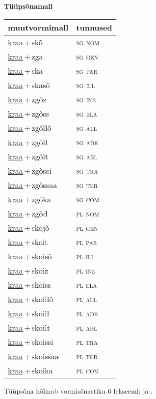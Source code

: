 
\vspace{1.8em}
\begin{minipage}{\textwidth}
\textbf{Tüüpsõnamall \,}\\

\begin{sideways}
\begin{tabular}{l l}
muutvormimall & tunnused \\
\hline
\underline{kraa}\,+\,skõ & \textsc{ sg nom } \\
\underline{kraa}\,+\,zga & \textsc{ sg gen } \\
\underline{kraa}\,+\,ska & \textsc{ sg par } \\
\underline{kraa}\,+\,skasõ & \textsc{ sg ill } \\
\underline{kraa}\,+\,zgõz & \textsc{ sg ine } \\
\underline{kraa}\,+\,zgõss & \textsc{ sg ela } \\
\underline{kraa}\,+\,zgõllõ & \textsc{ sg all } \\
\underline{kraa}\,+\,zgõll & \textsc{ sg ade } \\
\underline{kraa}\,+\,zgõlt & \textsc{ sg abl } \\
\underline{kraa}\,+\,zgõssi & \textsc{ sg tra } \\
\underline{kraa}\,+\,zgõssaa & \textsc{ sg ter } \\
\underline{kraa}\,+\,zgõka & \textsc{ sg com } \\
\underline{kraa}\,+\,zgõd & \textsc{ pl nom } \\
\underline{kraa}\,+\,skojõ & \textsc{ pl gen } \\
\underline{kraa}\,+\,skoit & \textsc{ pl par } \\
\underline{kraa}\,+\,skoisõ & \textsc{ pl ill } \\
\underline{kraa}\,+\,skoiz & \textsc{ pl ine } \\
\underline{kraa}\,+\,skoiss & \textsc{ pl ela } \\
\underline{kraa}\,+\,skoillõ & \textsc{ pl all } \\
\underline{kraa}\,+\,skoill & \textsc{ pl ade } \\
\underline{kraa}\,+\,skoilt & \textsc{ pl abl } \\
\underline{kraa}\,+\,skoissi & \textsc{ pl tra } \\
\underline{kraa}\,+\,skoissaa & \textsc{ pl ter } \\
\underline{kraa}\,+\,skoika & \textsc{ pl com } \\
\end{tabular}
\end{sideways}
\label{tab:tüüpsõnamall-kraaskõ}

\end{minipage}

 
\vspace{1em}
\noindent Tüüpsõna hõlmab vormisõnastiku 6 lekseemi:  ja .
